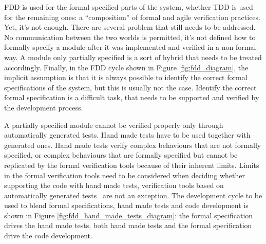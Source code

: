 \documentclass[english]{lni}
\begin{document}
FDD is used for the formal specified parts of the system, whether TDD is used for the remaining ones: a ``composition'' of formal and agile verification practices.
Yet, it's not enough.
There are several problem that still needs to be addressed.
No communication between the two worlds is permitted, it's not defined how to formally specify a module after it was implemented and verified in a non formal way.
A module only partially specified is a sort of hybrid that needs to be treated accordingly.
Finally, in the FDD cycle shown in Figure \ref{fig:fdd_diagram}, the implicit assumption is that it is always possible to identify the correct formal specifications of the system, but this is usually not the case.
Identify the correct formal specification is a difficult task, that needs to be supported and verified by the development process.

A partially specified module cannot be verified properly only through automatically generated tests.
Hand made tests have to be used together with generated ones.
Hand made tests verify complex behaviours that are not formally specified, or complex behaviours that are formally specified but cannot be replicated by the formal verification tools because of their inherent limits. 
Limits in the formal verification tools need to be considered when deciding whether supporting the code with hand made tests, verification tools based on automatically generated tests~\cite{Glass2002} are not an exception.
The development cycle to be used to blend formal specifications, hand made tests and code development is shown in Figure \ref{fig:fdd_hand_made_tests_diagram}: the formal specification drives the hand made tests, both hand made tests and the formal specification drive the code development.
\end{document}
